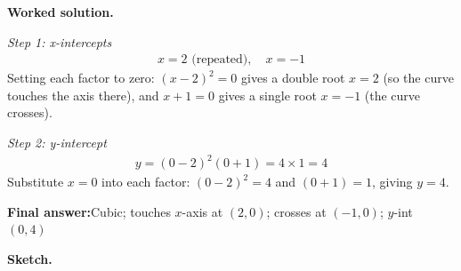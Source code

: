 \documentclass[11pt]{article}
\begin{document}
\textbf{Worked solution.}

\textit{Step 1: x-intercepts}
\[\begin{gathered}
x = 2 \text{ (repeated)}, \quad x = -1
\end{gathered}\]
Setting each factor to zero: \( (x-2)^2 = 0 \) gives a double root \( x = 2 \) (so the curve touches the axis there), and \( x + 1 = 0 \) gives a single root \( x = -1 \) (the curve crosses).

\textit{Step 2: y-intercept}
\[\begin{gathered}
y = (0-2)^2(0+1) = 4 \times 1 = 4
\end{gathered}\]
Substitute \( x = 0 \) into each factor: \( (0-2)^2 = 4 \) and \( (0+1) = 1 \), giving \( y = 4 \).

\begin{answerbox}
\textbf{Final answer:}\quad Cubic; touches \(\displaystyle x\)-axis at \(\displaystyle (2,0)\); crosses at \(\displaystyle (-1,0)\); \(\displaystyle y\)-int \(\displaystyle (0,4)\)
\end{answerbox}
\textbf{Sketch.}
\end{document}
